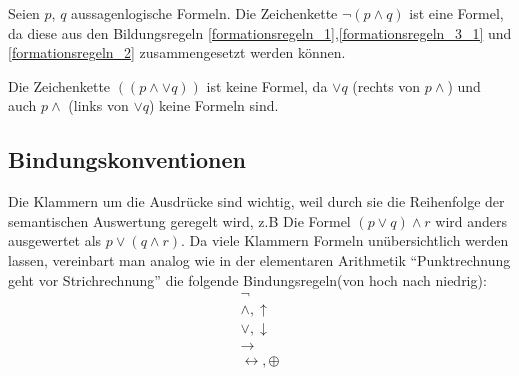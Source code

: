 \begin{ex}\label{Beispiel 2.1}\end{ex}
Seien $p$, $q$ aussagenlogische Formeln. 
Die Zeichenkette $\neg(p \wedge q)$ ist eine Formel, da diese aus den Bildungsregeln \eqref{formationsregeln_1},\eqref{formationsregeln_3_1} und \eqref{formationsregeln_2}  zusammengesetzt werden können.

Die Zeichenkette $((p \wedge \vee q))$ ist keine Formel, da $\vee q$ (rechts von $p \wedge$) und auch $p \wedge$ (links von $\vee q$) keine Formeln sind.\cite{Dreiseitl}


\subsection{Bindungskonventionen} \label{subsec:Bindungskonventionen}
Die Klammern um die Ausdrücke sind wichtig, weil durch sie die Reihenfolge der semantischen Auswertung geregelt wird, z.B Die Formel $(p \vee q) \wedge r$ wird anders ausgewertet als $p \vee (q \wedge r)$. Da viele Klammern Formeln unübersichtlich werden lassen, vereinbart man analog wie in der elementaren Arithmetik ``Punktrechnung geht vor Strichrechnung'' die folgende Bindungsregeln(von hoch nach niedrig):
\begin{align*}
\neg\\
\wedge, \uparrow\\
\vee, \downarrow\\
\rightarrow\\
\leftrightarrow, \oplus
\end{align*}



